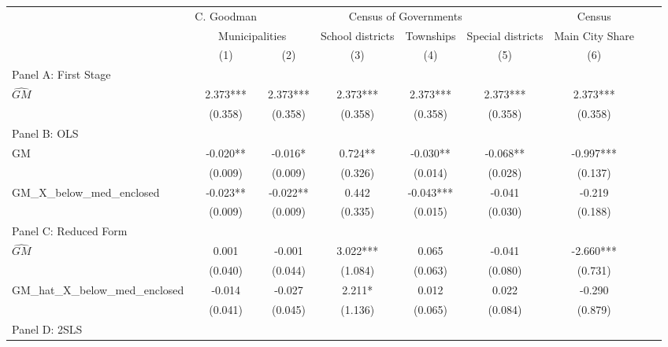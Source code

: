  \begin{tabular}{l*{8}{c}} \toprule
&\multicolumn{1}{c}{C. Goodman}&\multicolumn{4}{c}{Census of Governments}&\multicolumn{1}{c}{Census}\\\cmidrule(lr){2-2}\cmidrule(lr){3-6}\cmidrule(lr){7-7}
&\multicolumn{2}{c}{Municipalities}&\multicolumn{1}{c}{School districts}&\multicolumn{1}{c}{Townships}&\multicolumn{1}{c}{Special districts}&\multicolumn{1}{c}{Main City Share}\\\cmidrule(lr){2-3}\cmidrule(lr){4-6}\cmidrule(lr){7-7}
&\multicolumn{1}{c}{(1)}&\multicolumn{1}{c}{(2)}&\multicolumn{1}{c}{(3)}&\multicolumn{1}{c}{(4)}&\multicolumn{1}{c}{(5)}&\multicolumn{1}{c}{(6)}\\
\cmidrule(lr){1-7}
\multicolumn{6}{l}{Panel A: First Stage}\\
\cmidrule(lr){1-7}
$\widehat{GM}$  &    2.373***&    2.373***&    2.373***&    2.373***&    2.373***&    2.373***\\
                &  (0.358)   &  (0.358)   &  (0.358)   &  (0.358)   &  (0.358)   &  (0.358)   \\
\cmidrule(lr){1-7}
\multicolumn{6}{l}{Panel B: OLS}\\
\cmidrule(lr){1-7}
GM              &   -0.020** &   -0.016*  &    0.724** &   -0.030** &   -0.068** &   -0.997***\\
                &  (0.009)   &  (0.009)   &  (0.326)   &  (0.014)   &  (0.028)   &  (0.137)   \\
\addlinespace
GM\_X\_below\_med\_enclosed&   -0.023** &   -0.022** &    0.442   &   -0.043***&   -0.041   &   -0.219   \\
                &  (0.009)   &  (0.009)   &  (0.335)   &  (0.015)   &  (0.030)   &  (0.188)   \\
\cmidrule(lr){1-7}
\multicolumn{6}{l}{Panel C: Reduced Form}\\
\cmidrule(lr){1-7}
$\widehat{GM}$  &    0.001   &   -0.001   &    3.022***&    0.065   &   -0.041   &   -2.660***\\
                &  (0.040)   &  (0.044)   &  (1.084)   &  (0.063)   &  (0.080)   &  (0.731)   \\
\addlinespace
GM\_hat\_X\_below\_med\_enclosed&   -0.014   &   -0.027   &    2.211*  &    0.012   &    0.022   &   -0.290   \\
                &  (0.041)   &  (0.045)   &  (1.136)   &  (0.065)   &  (0.084)   &  (0.879)   \\
\cmidrule(lr){1-7}
\multicolumn{6}{l}{Panel D: 2SLS}\\

\end{tabular}
